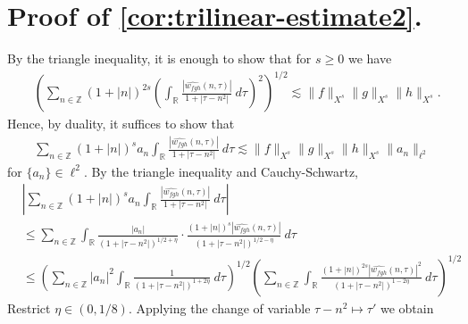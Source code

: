 \documentclass[12pt,reqno]{amsart}
\numberwithin{equation}{section}  %
\numberwithin{figure}{section}
\newcommand{\rr}{\mathbb{R}}
\newcommand{\zz}{\mathbb{Z}}
\newcommand{\wh}{\widehat}
\theoremstyle{plain}
\theoremstyle{definition}
\theoremstyle{remark}
\begin{document}
\section{Proof of \cref{cor:trilinear-estimate2}.}
By the triangle inequality, it is enough to show that
for $s \ge 0$ we have
%
%
\begin{equation}
  \begin{split}
    & \left( \sum_{n \in \zz} \left (1 + |n| \right )^{2s}  \left ( \int_\rr 
    \frac{|\wh{{w}_{fgh}}(n, \tau) |}{1 + | \tau - n^{2} |}
     \ d\tau \right)^2  \right)^{1/2} 
     \lesssim \|f\|_{X^s} \| g\|_{X^s}
    \| h \|_{X^s}.
  \end{split}
\end{equation}
%
Hence, by duality, it suffices to show that 
%
\begin{equation*}
  \begin{split}
    \sum_{n \in \zz} \left (1 + |n| \right )^{s}
    a_n \int_{\rr} \frac{|\wh{{w}_{fgh}}(n, \tau)|}{1 
    + | \tau - n^{2} |} \ d \tau \lesssim \|f\|_{X^s} \|g\|_{X^s} \|h\|_{X^s}
    \|a_n \|_{\ell^2}
  \end{split}
\end{equation*}
%
for $\{a_n\} \in \ell^2$. By the triangle inequality 
and Cauchy-Schwartz,
%
\begin{equation}
  \label{1m}
  \begin{split}
    & | \sum_{n \in \zz} \left (1 + |n| \right )^{s} a_n
    \int_{\rr}\frac{| \wh{{w}_{fgh}}(n, \tau) |}{1 + | \tau - n^{2} |} \ d \tau |
    \\
    & \le \sum_{n \in \zz} \int_{\rr} \frac{| a_n |}{\left( 1 + 
    | \tau - n^{2} |
    \right)^{1/2 + \eta}} \cdot \frac{\left( 1 + | n| \right)^s  |
    \wh{{w}_{fgh}}(n, \tau) |}{\left( 
    1 + | \tau - n^{2} | \right)^{1/2 - \eta}} \ d \tau
    \\
    & \le \left( \sum_{n \in \zz} | a_{n} |^2\int_{\rr} \frac{1}{\left( 1 + | \tau - n^{2} | \right)^{1 + 2 \eta}} \ d \tau  
    \right)^{1/2} 
    \left ( \sum_{n \in \zz}\int_{\rr} \frac{\left (1 + |n| \right )^{2s} | \wh{{w}_{fgh}}(n, \tau) 
    |^2}{\left( 1 + | \tau - n^{2} | \right)^{1 - 2 \eta}}\ d \tau 
    \right)^{1/2}
  \end{split}
\end{equation}
%
Restrict $\eta \in (0, 1/8)$. Applying the change of variable $\tau - n^{2}
\mapsto \tau'$ we obtain  %
\end{document}
